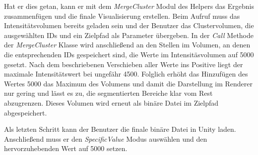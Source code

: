 Hat er dies getan, kann er mit dem \textit{MergeCluster} Modul des Helpers das Ergebnis zusammenfügen und die finale Visualisierung erstellen. Beim Aufruf muss das Intensitätsvolumen bereits geladen sein und der Benutzer das Clustervolumen, die ausgewählten IDs und ein Zielpfad als Parameter übergeben. In der \textit{Call} Methode der \textit{MergeCluster} Klasse wird anschließend an den Stellen im Volumen, an denen die entsprechenden IDs gespeichert sind, die Werte im Intensitäsvolumen auf 5000 gesetzt.
Nach dem beschriebenen Verschieben aller Werte ins Positive liegt der maximale Intensitätswert bei ungefähr 4500. Folglich erhöht das Hinzufügen des Wertes 5000 das Maximum des Volumens und damit die Darstellung im Renderer nur gering und lässt es zu, die segmentierten Bereiche klar vom Rest abzugrenzen. Dieses Volumen wird erneut als binäre Datei im Zielpfad abgespeichert.


Als letzten Schritt kann der Benutzer die finale binäre Datei in Unity laden. Anschließend muss er den \textit{SpecificValue} Modus auswählen und den hervorzuhebenden Wert auf 5000 setzen.













































